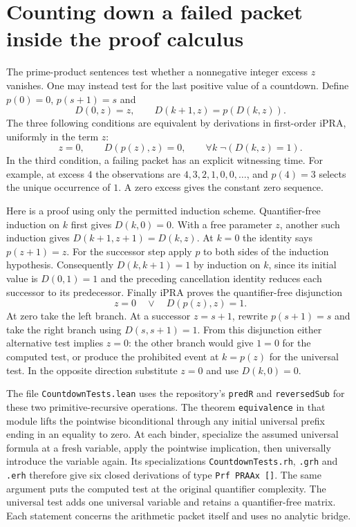 \section{Counting down a failed packet inside the proof calculus}
The prime-product sentences test whether a nonnegative integer excess
$z$ vanishes. One may instead test for the last positive value of a
countdown. Define $p(0)=0$, $p(s+1)=s$ and
\[
 D(0,z)=z,\qquad D(k+1,z)=p(D(k,z)).
\]
The three following conditions are equivalent by derivations in
first-order iPRA, uniformly in the term $z$:
\[
 z=0,\qquad D(p(z),z)=0,\qquad
             \forall k\;\neg(D(k,z)=1).
\]
In the third condition, a failing packet has an explicit witnessing time.
For example, at excess $4$ the observations are $4,3,2,1,0,0,\ldots$,
and $p(4)=3$ selects the unique occurrence of $1$. A zero excess gives
the constant zero sequence.

Here is a proof using only the permitted induction scheme. Quantifier-free
induction on $k$ first gives $D(k,0)=0$. With a free parameter $z$, another
such induction gives
$D(k+1,z+1)=D(k,z)$. At $k=0$ the identity says $p(z+1)=z$.
For the successor step apply $p$ to both sides of the induction
hypothesis. Consequently $D(k,k+1)=1$ by induction on $k$, since its
initial value is $D(0,1)=1$ and the preceding cancellation identity
reduces each successor to its predecessor. Finally iPRA proves the
quantifier-free disjunction
\[
          z=0\quad\lor\quad D(p(z),z)=1 .
\]
At zero take the left branch. At a successor $z=s+1$, rewrite
$p(s+1)=s$ and take the right branch using $D(s,s+1)=1$.
From this disjunction either alternative test implies $z=0$: the other
branch would give $1=0$ for the computed test, or produce the prohibited
event at $k=p(z)$ for the universal test. In the opposite direction
substitute $z=0$ and use $D(k,0)=0$.

The file \texttt{CountdownTests.lean} uses the repository's
\texttt{predR} and \texttt{reversedSub} for these two primitive-recursive
operations. The theorem \texttt{equivalence} in that module lifts the pointwise
biconditional through any initial universal prefix ending in an equality
to zero. At each binder, specialize the assumed universal formula at a
fresh variable, apply the pointwise implication, then universally
introduce the variable again. Its specializations
\texttt{CountdownTests.rh}, \texttt{.grh} and \texttt{.erh} therefore
give six closed derivations of type \texttt{Prf PRAAx []}. The same
argument puts the computed test at the original quantifier complexity.
The universal test adds one universal variable and retains a
quantifier-free matrix. Each statement concerns the arithmetic packet
itself and uses no analytic bridge.
